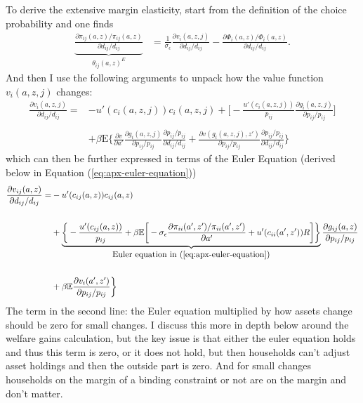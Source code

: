 \documentclass[12pt,pdftex]{article}
\begin{document}
\begin{onehalfspacing}
To derive the extensive margin elasticity, start from the definition of the choice probability and one finds
\begin{align}
\underbrace{ \frac{\partial \pi_{ij}(a,z) / \pi_{ij}(a,z)}{\partial d_{ij} / d_{ij}} }_{\theta_{ij}(a,z)^{E}} &= \frac{1}{\sigma_{\epsilon}}\frac{\partial v_{i}(a, z, j)}{\partial d_{ij}/d_{ij}} -  \frac{\partial \Phi_{i}(a,z) / \Phi_{i}(a,z)}{\partial d_{ij}/d_{ij}}.
\label{eq:apx-extensive-margin}
\end{align}
And then I use the following arguments to unpack how the value function $v_{i}(a, z, j)$ changes:
\begin{align}
\frac{\partial v_{i}(a,z,j)}{\partial d_{ij}/d_{ij}}  =& -u'(c_{i}(a,z,j))c_{i}(a,z,j) + \bigg [ -\frac{u'(c_{i}(a,z,j))}{p_{ij}}\frac{\partial g_{i}(a,z,j)}{\partial p_{ij}/ p_{ij}} \bigg ]  \\
\nonumber \\
&+ \beta \mathrm{E} \bigg \{\frac{\partial v}{\partial a'}\frac{\partial g_{i}(a,z,j)}{\partial p_{ij}/ p_{ij}}\frac{ \partial p_{ij}/ p_{ij}}{\partial d_{ij}/ d_{ij}} +  \frac{\partial v(g_{i}(a,z,j),z')}{\partial p_{ij}/ p_{ij}}\frac{ \partial p_{ij}/ p_{ij}}{\partial d_{ij}/ d_{ij}} \bigg \}
\end{align}
which can then be further expressed in terms of the Euler Equation (derived below in Equation (\ref{eq:apx-euler-equation}))
\begin{align}
\frac{\partial v_{ij}(a,z)}{\partial d_{ij}/d_{ij}}  =& -u'(c_{ij}(a,z))c_{ij}(a,z) \label{eq:apx-first-term}\\
\nonumber \\
&+ \underbrace{\bigg \{ -\frac{u'(c_{ij}(a,z))}{p_{ij}} + \beta \mathbb{E} \bigg [ -\sigma_{\epsilon} \frac{\partial \pi_{ii}(a',z') / \pi_{ii}(a',z')}{\partial a'} + u'(c_{ii}(a',z'))R \bigg ] \bigg \} }_{\mbox{Euler equation in (\ref{eq:apx-euler-equation})}} \frac{\partial g_{ij}(a,z)}{\partial p_{ij}/ p_{ij}} \\
\nonumber \\
&+  \beta \mathbb{E}\frac{\partial v_{i}(a',z')}{\partial p_{ij}/ p_{ij}} \bigg \}
\end{align}
The term in the second line: the Euler equation multiplied by how assets change should be zero for small changes. I discuss this more in depth below around the welfare gains calculation, but the key issue is that either the euler equation holds and thus this term is zero, or it does not hold, but then households can't adjust asset holdings and then the outside part is zero. And for small changes households on the margin of a binding constraint or not are on the margin and don't matter.


\end{onehalfspacing}
\end{document}
